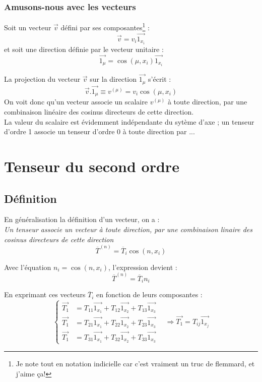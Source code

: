     
\subsubsection{Amusons-nous avec les vecteurs}
Soit un vecteur $\vec{v}$ défini par ses composantes\footnote{Je note tout en notation indicielle
car c'est vraiment un truc de flemmard, et j'aime ça!} :
\begin{equation}
	\vec{v} = v_i\vec{1_{x_i}}
\end{equation}
et soit une direction définie par le vecteur unitaire :
\begin{equation}
	\vec{1_\mu} = \cos(\mu,x_i)\vec{1_{x_i}}
\end{equation}
        
La projection du vecteur $\vec{v}$ sur la direction $\vec{1_\mu}$ s'écrit :
\begin{equation}
	\vec{v}.\vec{1_\mu} \equiv v^{(\mu)} = v_i\cos(\mu, x_i)
\end{equation}
On voit donc qu'un vecteur associe un scalaire $v^{(\mu)}$ à toute direction, par une combinaison
linéaire des cosinus directeurs de cette direction.\\
La valeur du scalaire est évidemment indépendante du sytème d'axe ; un tenseur d'ordre 1 associe un 
tenseur d'ordre 0 à toute direction par ...
        
        
        
\section{Tenseur du second ordre}
\subsection{Définition}
En généralisation la définition d'un vecteur, on a : \\
\textit{Un tenseur associe un vecteur à toute direction, par une combinaison linaire des cosinus
directeurs de cette direction}
\begin{equation}
	\overline{T}^{(n)} = \overline{T}_i\cos(n,x_i)
\end{equation}
    
Avec l'équation $n_i = \cos(n,x_i)$, l'expression devient :
\begin{equation}
	\overline{T}^{(n)} = \overline{T}_in_i
\end{equation}
    
En exprimant ces vecteurs $\overline{T}_i$ en fonction de leurs composantes :
\begin{equation}
	\left\{\begin{array}{ll}
	\vec{T_1}&= T_{11} \vec{1_{x_1}}+T_{12} \vec{1_{x_2}}+T_{13} \vec{1_{x_3}}  \\
	\vec{T_1}&= T_{21} \vec{1_{x_1}}+T_{22} \vec{1_{x_2}}+T_{23} \vec{1_{x_3}}  \\
	\vec{T_1}&= T_{31} \vec{1_{x_1}}+T_{32} \vec{1_{x_2}}+T_{33} \vec{1_{x_3}}  
	\end{array}\right.\ \ \ \ \Rightarrow \vec{T_1} = T_{ij}\vec{1_{x_j}}
\end{equation}

